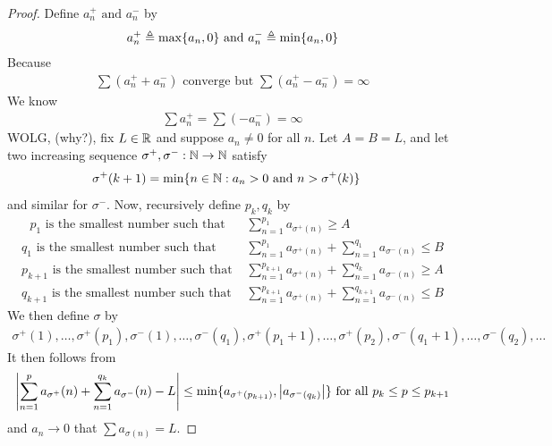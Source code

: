 \documentclass{report}
\begin{document}
\begin{proof}
Define $a_n^+\text{ and }a_n^-$ by 
\begin{align*}
a_n^+\triangleq \max \{ a_n,0 \}\text{ and }a_n^-\triangleq \min \{ a_n,0 \}
\end{align*}
Because 
\begin{align*}
\sum (a_n^++a_n^-)\text{ converge but }\sum (a_n^+-a_n^-)=\infty
\end{align*}
We know 
\begin{align*}
\sum a_n^+=\sum (-a_n^-)=\infty
\end{align*}
WOLG, (why?), fix $L\in\mathbb{R}$ and suppose $a_n\neq 0$ for all $n$. Let $A=B=L$, and let two increasing sequence $\sigma^+,\sigma^-:\mathbb{N}\rightarrow \mathbb{N}$ satisfy 
\begin{align*}
  \sigma^+(k+1)&=\min \{ n\in\mathbb{N}:a_n>0\text{ and }n>\sigma^+(k) \}
\end{align*}
and similar for $\sigma^-$. Now, recursively define $p_k,q_k$ by 
\begin{align}
  \text{ $p_1$ is the smallest number such that  }&\sum_{n=1}^{p_1} a_{\sigma ^+(n)}\geq A\label{ba1}\\
  q_1\text{ is the smallest number such that }&\sum_{n=1}^{p_1}a_{\sigma^+(n)}+\sum_{n=1}^{q_1}a_{\sigma^-(n)}\leq B \label{ba2}\\
  p_{k+1}\text{ is the smallest number such that }&\sum_{n=1}^{p_{k+1}}a_{\sigma^+(n)}+\sum_{n=1}^{q_k}a_{\sigma^-(n)}\geq A\label{ba3}\\
  q_{k+1}\text{ is the smallest number such that }&\sum_{n=1}^{p_{k+1}}a_{\sigma^+(n)}+\sum_{n=1}^{q_{k+1}}a_{\sigma^-(n)}\leq B\label{ba4}
\end{align}
We then define $\sigma$ by 
\begin{align*}
  \sigma^+(1),\dots ,\sigma^+(p_1),\sigma^-(1),\dots ,\sigma^-(q_1),\sigma^+(p_1+1),\dots ,\sigma^+(p_2),\sigma^-(q_1+1),\dots ,\sigma^-(q_2),\dots 
\end{align*}
It then follows from 
\begin{align*}
  \left|\sum_{n=1}^{p}a_{\sigma^+}(n)+\sum_{n=1}^{q_k}a_{\sigma^-}(n)-L\right|\leq \min \{ a_{\sigma^+(p_{k+1})},\left|a_{\sigma^-(q_k)}\right| \}\text{ for all  }p_k\leq p\leq p_{k+1}
\end{align*}
and $a_n\to 0$ that $\sum a_{\sigma (n)}=L$.
\end{proof}
\end{document}
